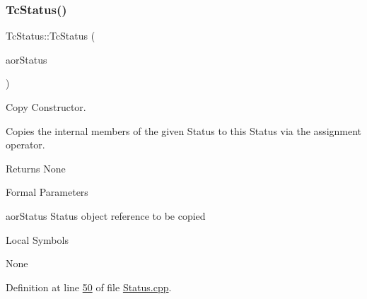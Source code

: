 \mbox{\label{class_g_n_common_1_1_n_notification_1_1_tc_status_abfb0ff092f9a23017fc89dcd1d6f4e6f}} 
\subsubsection{\texorpdfstring{Tc\+Status()}{TcStatus()}\hspace{0.1cm}{\footnotesize\ttfamily [2/2]}}
{\footnotesize\ttfamily Tc\+Status\+::\+Tc\+Status (\begin{DoxyParamCaption}\item[{const \mbox{\hyperlink{class_g_n_common_1_1_n_notification_1_1_tc_status}{Tc\+Status}} \&}]{aor\+Status }\end{DoxyParamCaption})}



Copy Constructor. 

Copies the internal members of the given Status to this Status via the assignment operator.

\begin{DoxyReturn}{Returns}
None
\end{DoxyReturn}
\begin{DoxyParagraph}{Formal Parameters}

\begin{DoxyPre}{\ttfamily [ in ]  aorStatus    Status object reference to be copied }\end{DoxyPre}

\end{DoxyParagraph}
\begin{DoxyParagraph}{Local Symbols}

\begin{DoxyPre}{\ttfamily  None }\end{DoxyPre}
 
\end{DoxyParagraph}


Definition at line \mbox{\hyperlink{_status_8cpp_source_l00050}{50}} of file \mbox{\hyperlink{_status_8cpp_source}{Status.\+cpp}}.

\mbox{\label{class_g_n_common_1_1_n_notification_1_1_tc_status_af14caf8abaf597904cebb6d414fd1dcf}} 
